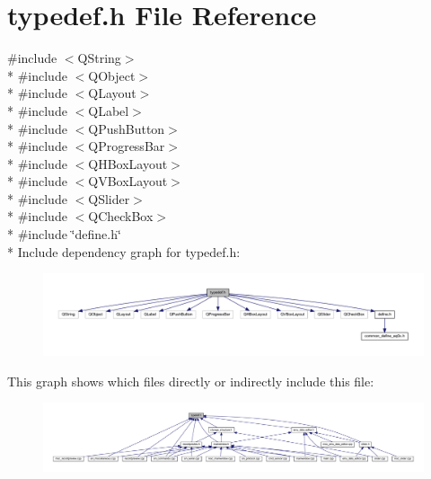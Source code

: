 \hypertarget{a00001}{\section{typedef.\+h File Reference}
\label{a00001}
}
{\ttfamily \#include $<$Q\+String$>$}\\*
{\ttfamily \#include $<$Q\+Object$>$}\\*
{\ttfamily \#include $<$Q\+Layout$>$}\\*
{\ttfamily \#include $<$Q\+Label$>$}\\*
{\ttfamily \#include $<$Q\+Push\+Button$>$}\\*
{\ttfamily \#include $<$Q\+Progress\+Bar$>$}\\*
{\ttfamily \#include $<$Q\+H\+Box\+Layout$>$}\\*
{\ttfamily \#include $<$Q\+V\+Box\+Layout$>$}\\*
{\ttfamily \#include $<$Q\+Slider$>$}\\*
{\ttfamily \#include $<$Q\+Check\+Box$>$}\\*
{\ttfamily \#include \char`\"{}define.\+h\char`\"{}}\\*
Include dependency graph for typedef.\+h\+:
\nopagebreak
\begin{figure}[H]
\begin{center}
\leavevmode
\includegraphics[width=350pt]{de/dc2/a00228}
\end{center}
\end{figure}
This graph shows which files directly or indirectly include this file\+:
\nopagebreak
\begin{figure}[H]
\begin{center}
\leavevmode
\includegraphics[width=350pt]{dd/d2d/a00229}
\end{center}
\end{figure}
